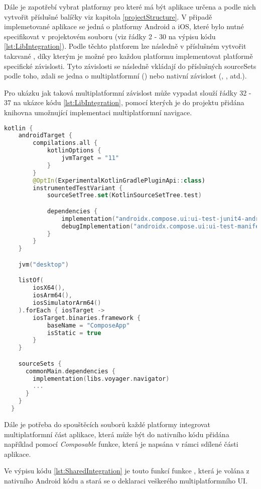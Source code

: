 Dále je zapotřebí vybrat platformy pro které má být aplikace určena a podle nich vytvořit příslušné balíčky viz kapitola \ref{projectStructure}.
V připadě implemetované aplikace se jedná o platformy Android a iOS, které bylo nutné specifikovat v projektovém souboru 
 (viz řádky 2 - 30 na výpisu kódu \ref{lst:LibIntegration}).
Podle těchto platforem lze následně v příslušném  vytvořit takzvané , díky kterým je možné
pro každou platformu implementovat platformě specifické závislosti. Tyto závislosti se následně vkládají do příslušných
sourceSets podle toho, zdali se jedna o multiplatformní () nebo nativní závislost (, , atd.).

Pro ukázku jak taková multiplatformní závislost může vypadat slouží řádky 32 - 37 na ukázce kódu \ref{lst:LibIntegration}, pomocí 
kterých je do projektu přidána knihovna umožnující implementaci multiplatformní navigace.

\begin{lstlisting}[caption={Lib integration}, label={lst:LibIntegration}, language=Kotlin]
  kotlin {
    androidTarget {
        compilations.all {
            kotlinOptions {
                jvmTarget = "11"
            }
        }
        @OptIn(ExperimentalKotlinGradlePluginApi::class)
        instrumentedTestVariant {
            sourceSetTree.set(KotlinSourceSetTree.test)

            dependencies {
                implementation("androidx.compose.ui:ui-test-junit4-android:1.6.4")
                debugImplementation("androidx.compose.ui:ui-test-manifest:1.6.4")
            }
        }
    }

    jvm("desktop")

    listOf(
        iosX64(),
        iosArm64(),
        iosSimulatorArm64()
    ).forEach { iosTarget ->
        iosTarget.binaries.framework {
            baseName = "ComposeApp"
            isStatic = true
        }
    }

    sourceSets {
      commonMain.dependencies {
        implementation(libs.voyager.navigator)
        ...
      }
    }
  }
\end{lstlisting}

Dále je potřeba do spouštěcích souborů každé platformy integrovat multiplatformní část aplikace, která může být do nativního kódu přidána
například pomocí \textit{Composable} funkce, která je napsána v rámci sdílené části aplikace.

Ve výpisu kódu \ref{lst:SharedIntegration} je touto funkcí funkce , která je volána z nativního Android kódu a stará se
o deklaraci veškerého multiplatformního UI.

